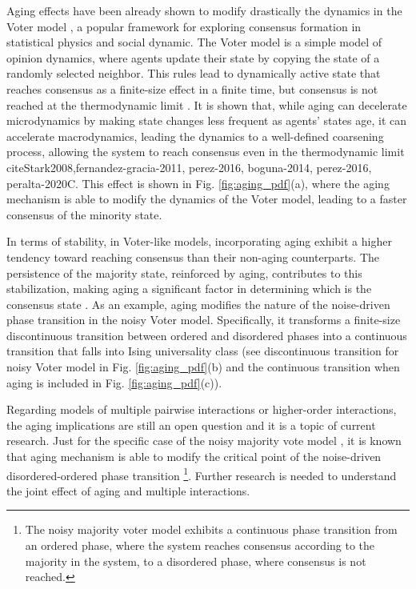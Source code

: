 Aging effects have been already shown to modify drastically the dynamics in the Voter model \cite{Voter-original}, a popular framework for exploring consensus formation in statistical physics and social dynamic. The Voter model is a simple model of opinion dynamics, where agents update their state by copying the state of a randomly selected neighbor. This rules lead to dynamically active state that reaches consensus as a finite-size effect in a finite time, but consensus is not reached at the thermodynamic limit \cite{Voter-original}. It is shown that, while aging can decelerate microdynamics by making state changes less frequent as agents' states age, it can accelerate macrodynamics, leading the dynamics to a well-defined coarsening process, allowing the system to reach consensus even in the thermodynamic limit cite{Stark2008,fernandez-gracia-2011, perez-2016, boguna-2014, perez-2016, peralta-2020C}. This effect is shown in Fig. \ref{fig:aging_pdf}(a), where the aging mechanism is able to modify the dynamics of the Voter model, leading to a faster consensus of the minority state.

In terms of stability, in Voter-like models, incorporating aging exhibit a higher tendency toward reaching consensus than their non-aging counterparts. The persistence of the majority state, reinforced by aging, contributes to this stabilization, making aging a significant factor in determining which is the consensus state \cite{artime2019herding, peralta-2020, baron2022analytical}. As an example, aging modifies the nature of the noise-driven phase transition in the noisy Voter model. Specifically, it transforms a finite-size discontinuous transition between ordered and disordered phases into a continuous transition that falls into Ising universality class \cite{artime-2018} (see discontinuous transition for noisy Voter model in Fig. \ref{fig:aging_pdf}(b) and the continuous transition when aging is included in Fig. \ref{fig:aging_pdf}(c)).

Regarding models of multiple pairwise interactions or higher-order interactions, the aging implications are still an open question and it is a topic of current research. Just for the specific case of the noisy majority vote model \cite{chen-2020}, it is known that aging mechanism is able to modify the critical point of the noise-driven disordered-ordered phase transition \footnote{\sffamily\small The noisy majority voter model exhibits a continuous phase transition from an ordered phase, where the system reaches consensus according to the majority in the system, to a disordered phase, where consensus is not reached.}. Further research is needed to understand the joint effect of aging and multiple interactions.